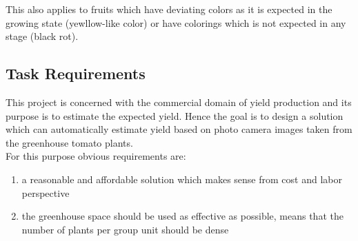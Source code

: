 This also applies to fruits which have deviating colors as it is expected in the
growing state (yewllow-like color) or have colorings which is not expected in any stage (black rot).

\subsection{Task Requirements}\label{subsec:task-requirements}

This project is concerned with the commercial domain of yield production and its purpose
is to estimate the expected yield.
Hence the goal is to design a solution which can automatically estimate yield based on photo camera images
taken from the greenhouse tomato plants.\\

For this purpose obvious requirements are:
\begin{enumerate}
    \item a reasonable and affordable solution which makes sense from cost and labor perspective
    \item the greenhouse space should be used as effective as possible, means that the number of plants per group unit should be dense
\end{enumerate}
\newpage
